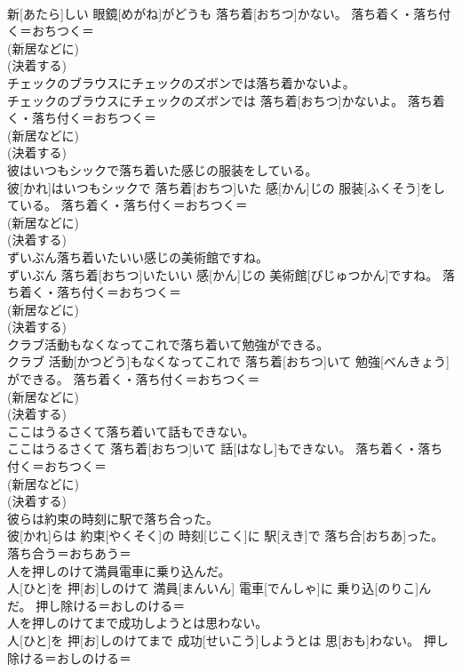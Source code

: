 \documentclass[8pt]{extreport}
\begin{document}
\begin{CJK}{UTF8}{min}
{\\	新[あたら]しい 眼鏡[めがね]がどうも 落ち着[おちつ]かない。	落ち着く・落ち付く＝おちつく＝ 
\\	(新居などに) 
\\	(決着する) 
\\	チェックのブラウスにチェックのズボンでは落ち着かないよ。	
\\	チェックのブラウスにチェックのズボンでは 落ち着[おちつ]かないよ。	落ち着く・落ち付く＝おちつく＝ 
\\	(新居などに) 
\\	(決着する) 
\\	彼はいつもシックで落ち着いた感じの服装をしている。	
\\	彼[かれ]はいつもシックで 落ち着[おちつ]いた 感[かん]じの 服装[ふくそう]をしている。	落ち着く・落ち付く＝おちつく＝ 
\\	(新居などに) 
\\	(決着する) 
\\	ずいぶん落ち着いたいい感じの美術館ですね。	
\\	ずいぶん 落ち着[おちつ]いたいい 感[かん]じの 美術館[びじゅつかん]ですね。	落ち着く・落ち付く＝おちつく＝ 
\\	(新居などに) 
\\	(決着する) 
\\	クラブ活動もなくなってこれで落ち着いて勉強ができる。	
\\	クラブ 活動[かつどう]もなくなってこれで 落ち着[おちつ]いて 勉強[べんきょう]ができる。	落ち着く・落ち付く＝おちつく＝ 
\\	(新居などに) 
\\	(決着する) 
\\	ここはうるさくて落ち着いて話もできない。	
\\	ここはうるさくて 落ち着[おちつ]いて 話[はなし]もできない。	落ち着く・落ち付く＝おちつく＝ 
\\	(新居などに) 
\\	(決着する) 
\\	彼らは約束の時刻に駅で落ち合った。	
\\	彼[かれ]らは 約束[やくそく]の 時刻[じこく]に 駅[えき]で 落ち合[おちあ]った。	落ち合う＝おちあう＝ 
\\	人を押しのけて満員電車に乗り込んだ。	
\\	人[ひと]を 押[お]しのけて 満員[まんいん] 電車[でんしゃ]に 乗り込[のりこ]んだ。	押し除ける＝おしのける＝ 
\\	人を押しのけてまで成功しようとは思わない。	
\\	人[ひと]を 押[お]しのけてまで 成功[せいこう]しようとは 思[おも]わない。	押し除ける＝おしのける＝ 
}
\end{CJK}
\end{document}

